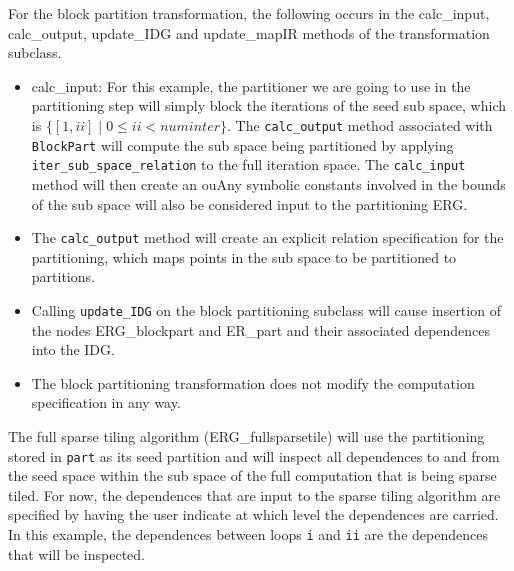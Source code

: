 \documentclass{article}
\begin{document}
For the block partition transformation, the following occurs in the calc\_input, calc\_output, update\_IDG and update\_mapIR methods of the transformation subclass.
	\begin{itemize}	
	  \item calc\_input:	  
	  For this example, the partitioner we are going to use in the partitioning step will simply block the iterations of the seed sub space, which is $\{[1,ii] \; | \; 0 \leq ii < numinter \}$.
The {\tt calc\_output} method
associated with {\tt BlockPart} will compute the sub space being partitioned 
by applying {\tt iter\_sub\_space\_relation} to the
full iteration space.  The  {\tt calc\_input} method will then create an ouAny symbolic constants involved in the bounds of the sub space will also be considered input
to the partitioning ERG.

	\item The {\tt calc\_output} method will create an explicit relation specification for the partitioning, which maps points in the sub space to be partitioned to partitions.

	 \item Calling {\tt update\_IDG} on the block partitioning subclass  
	 will cause insertion of the nodes ERG\_blockpart and ER\_part and their associated dependences into the IDG.
	 
	 \item The block partitioning transformation does not modify the computation specification in any way.
	 
	\end{itemize}

The full sparse tiling algorithm (ERG\_fullsparsetile) will use the partitioning stored in {\tt part} as its seed partition
and will inspect all dependences to and from the seed space within the sub space of the full computation that is being sparse tiled.  For now, the dependences that are input to the sparse tiling algorithm are specified by having the user indicate at which level the dependences are carried.  In this example, the dependences between loops {\tt i} and {\tt ii} are the dependences that will be inspected.

\end{document}
